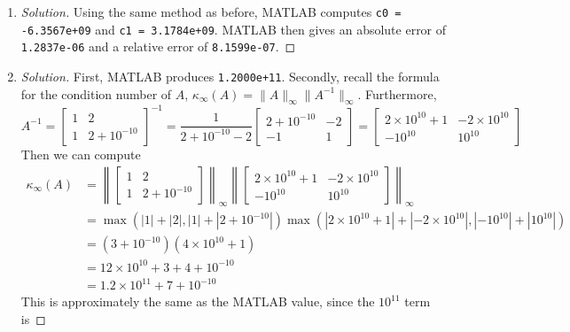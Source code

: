 \documentclass{article}
\begin{document}
\begin{enumerate}
\begin{proof}[Solution]
		MATLAB then gives an absolute error of
		\verb|6.1605e-11| and a relative error of \verb|3.9161e-11|.
	\end{proof}
	\item \begin{proof}[Solution]\let\qed\relax
		Using the same method as before, MATLAB computes
		\verb|c0 = -6.3567e+09| and \verb|c1 = 3.1784e+09|.
		MATLAB then gives an absolute error of
		\verb|1.2837e-06| and a relative error of \verb|8.1599e-07|.
	\end{proof}
	\item \begin{proof}[Solution]\let\qed\relax
		First, MATLAB produces \verb|1.2000e+11|.
		Secondly, recall the formula for the condition number of $A$,
		$\kappa_\infty(A) = \lVert A \rVert_\infty \lVert A^{-1} \rVert_\infty$.
		Furthermore,
		\[
			A^{-1} = \begin{bmatrix} 1 & 2 \\ 1 & 2 + 10^{-10} \end{bmatrix}^{-1}
			= \frac{1}{2 + 10^{-10} - 2}
			\begin{bmatrix} 2 + 10^{-10} & -2 \\ -1 & 1 \end{bmatrix}
			= \begin{bmatrix} 2\times 10^{10} + 1 & -2 \times 10^{10}\\
			-10^{10} & 10^{10} \end{bmatrix}
		\]
		Then we can compute
		\begin{align*}
			\kappa_\infty(A)
			&= \left\lVert \begin{bmatrix} 1 & 2 \\ 1 & 2 + 10^{-10} \end{bmatrix}
			\right\rVert_\infty
			\left\lVert \begin{bmatrix} 2\times10^{10} + 1 & -2\times 10^{10} \\
			-10^{10} & 10^{10} \end{bmatrix} \right\rVert_\infty\\
			&= \max(|1| + |2|, |1| + |2+10^{-10}|)
				\max(|2\times 10^{10} + 1| + |-2\times 10^{10}|, |-10^{10}| + |10^{10}|)\\
			&= (3 + 10^{-10})(4 \times 10^{10} + 1)\\
			&= 12 \times 10^{10} + 3 + 4 + 10^{-10}\\
			&= 1.2 \times 10^{11} + 7 + 10^{-10}
		\end{align*}
		This is approximately the same as the MATLAB value, since the $10^{11}$ term is

\end{proof}
\end{enumerate}
\end{document}
